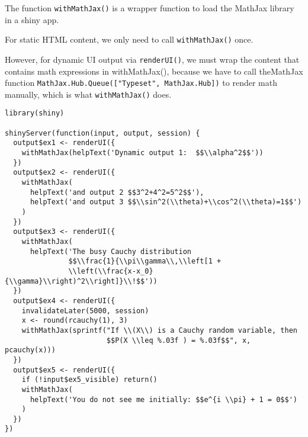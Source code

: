 The function \texttt{withMathJax()} is a wrapper function to load the MathJax library in a shiny app. 

For static HTML content, we only need to call \texttt{withMathJax()}  once. 

However, for dynamic UI output via \texttt{renderUI()}, we must wrap the content that contains math expressions in withMathJax(), 
because we have to call theMathJax function \texttt{MathJax.Hub.Queue(["Typeset", MathJax.Hub])} to render math manually, 
which is what \texttt{withMathJax()} does.

\begin{framed}
\begin{verbatim}
library(shiny)

shinyServer(function(input, output, session) {
  output$ex1 <- renderUI({
    withMathJax(helpText('Dynamic output 1:  $$\\alpha^2$$'))
  })
  output$ex2 <- renderUI({
    withMathJax(
      helpText('and output 2 $$3^2+4^2=5^2$$'),
      helpText('and output 3 $$\\sin^2(\\theta)+\\cos^2(\\theta)=1$$')
    )
  })
  output$ex3 <- renderUI({
    withMathJax(
      helpText('The busy Cauchy distribution
               $$\\frac{1}{\\pi\\gamma\\,\\left[1 +
               \\left(\\frac{x-x_0}{\\gamma}\\right)^2\\right]}\\!$$'))
  })
  output$ex4 <- renderUI({
    invalidateLater(5000, session)
    x <- round(rcauchy(1), 3)
    withMathJax(sprintf("If \\(X\\) is a Cauchy random variable, then
                        $$P(X \\leq %.03f ) = %.03f$$", x, pcauchy(x)))
  })
  output$ex5 <- renderUI({
    if (!input$ex5_visible) return()
    withMathJax(
      helpText('You do not see me initially: $$e^{i \\pi} + 1 = 0$$')
    )
  })
})
\end{verbatim}
\end{framed}
